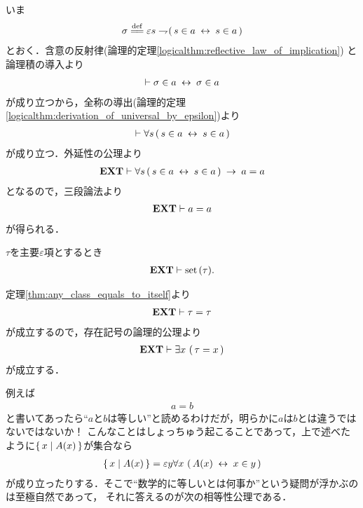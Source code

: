 	\begin{sketch}
		いま
		\begin{align}
			\sigma \defeq 
			\varepsilon s \negation (\, s \in a \lrarrow s \in a\, )
		\end{align}
		とおく．含意の反射律(論理的定理\ref{logicalthm:reflective_law_of_implication})
		と論理積の導入より
		\begin{align}
			\vdash \sigma \in a \hspace{0.25em}\leftrightarrow\hspace{0.25em} \sigma \in a
		\end{align}
		が成り立つから，全称の導出(論理的定理\ref{logicalthm:derivation_of_universal_by_epsilon})より
		\begin{align}
			\vdash \forall s\, (\, s \in a  \hspace{0.25em}\leftrightarrow\hspace{0.25em} s \in a\, )
		\end{align}
		が成り立つ．外延性の公理より
		\begin{align}
			\mbox{{\bf EXT}} \vdash \forall s\, (\, s \in a  \hspace{0.25em}\leftrightarrow\hspace{0.25em} s \in a\, )
			\hspace{0.25em}\rightarrow\hspace{0.25em} a = a
		\end{align}
		となるので，三段論法より
		\begin{align}
			\mbox{{\bf EXT}} \vdash a = a
		\end{align}
		が得られる．
		\QED
	\end{sketch}
	
	\begin{screen}
		\begin{thm}
		\label{thm:critical_epsilon_term_is_set}
			$\tau$を主要$\varepsilon$項とするとき
			\begin{align}
				\mbox{{\bf EXT}} \vdash \operatorname*{set}\hspace{0.15em}(\tau).
			\end{align}
		\end{thm}
	\end{screen}
	
	\begin{sketch}
		定理\ref{thm:any_class_equals_to_itself}より
		\begin{align}
			\mbox{{\bf EXT}} \vdash \tau = \tau
		\end{align}
		が成立するので，存在記号の論理的公理より
		\begin{align}
			\mbox{{\bf EXT}} \vdash \exists x\, \left(\, \tau = x\, \right)
		\end{align}
		が成立する．
		\QED
	\end{sketch}
	
	例えば
	\begin{align}
		a = b
	\end{align}
	と書いてあったら``$a$と$b$は等しい''と読めるわけだが，明らかに$a$は$b$とは違うではないではないか！
	こんなことはしょっちゅう起こることであって，上で述べたように$\{\, x \mid A(x)\, \}$が集合なら
	\begin{align}
		\{\, x \mid A(x)\, \} = \varepsilon y \forall x\, \left(\, A(x) \hspace{0.25em}\leftrightarrow\hspace{0.25em} x \in y\, \right)
	\end{align}
	が成り立ったりする．そこで``数学的に等しいとは何事か''という疑問が浮かぶのは至極自然であって，
	それに答えるのが次の相等性公理である．
	

